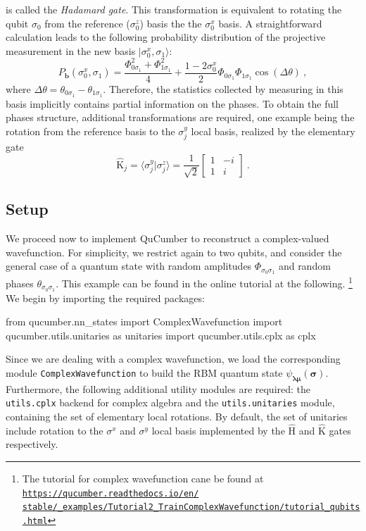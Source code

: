 \documentclass[submission, Phys, hidelinks]{SciPost}
\begin{document}
is called the {\it Hadamard gate}. This transformation is equivalent to rotating the qubit $\sigma_0$ from the reference ($\sigma_0^z$) basis the the $\sigma_0^x$ basis. A straightforward calculation leads to the following probability distribution of the projective measurement in the new basis $|\sigma_0^x,\sigma_1\rangle$: 
\begin{equation}
	P_{\bm{b}}(\sigma_0^x,\sigma_1)=\frac{\Phi_{0\sigma_1}^2+\Phi_{1\sigma_1}^2}{4}+\frac{1-2\sigma_0^x}{2}\Phi_{0\sigma_1}\Phi_{1\sigma_1}\cos(\Delta\theta)\:,
\end{equation}
where $\Delta\theta=\theta_{0\sigma_1}-\theta_{1\sigma_1}$. Therefore, the statistics collected by measuring in this basis implicitly contains partial information on the phases. To obtain the full phases structure, additional transformations are required, one example being the rotation from the reference basis to the $\sigma^y_j$ local basis, realized by
the elementary gate
\begin{equation}
		\hat{\mathrm{K}}_j=\langle\sigma_j^y|\sigma_j^z\rangle=\frac{1}{\sqrt{2}}\begin{bmatrix}1 & -i\\
	1 & i
\end{bmatrix}\:.
\end{equation}


\subsection{Setup}
We proceed now to implement QuCumber to reconstruct a complex-valued wavefunction. For simplicity, we restrict again to two qubits, and consider the general case of a quantum state with random amplitudes $\Phi_{\sigma_0\sigma_1}$ and random phases $\theta_{\sigma_0\sigma_1}$. This example can be found in the online tutorial at the following.
\footnote{The tutorial for complex wavefunction cane be found at
			\href{https://qucumber.readthedocs.io/en/stable/\_examples/Tutorial2_TrainComplexWavefunction/tutorial_qubits.html
        }{\texttt{https://qucumber.readthedocs.io/en/\\stable/\_examples/Tutorial2\_TrainComplexWavefunction/tutorial\_qubits.html}}
}
We begin by importing the required packages:

\begin{python}
from qucumber.nn_states import ComplexWavefunction
import qucumber.utils.unitaries as unitaries
import qucumber.utils.cplx as cplx
\end{python}
Since we are dealing with a complex wavefunction, we load the corresponding module 
\verb|ComplexWavefunction| to build the RBM quantum state $\psi_{\bm{\lambda\mu}}(\bm{\sigma})$. Furthermore, the following additional utility modules are required: the \verb|utils.cplx| backend for complex algebra and the \verb|utils.unitaries| module, containing the set of elementary local rotations. By default, the set of unitaries include rotation to the $\sigma^x$ and $\sigma^y$ local basis implemented by the $\hat{\mathrm{H}}$ and $\hat{\mathrm{K}}$ gates respectively.
\end{document}

